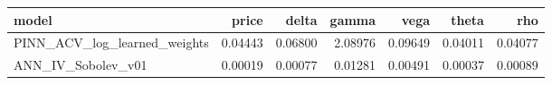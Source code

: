 \begin{tabular}{lrrrrrr}
\toprule
model & price & delta & gamma & vega & theta & rho \\
\midrule
PINN_ACV_log_learned_weights & 0.04443 & 0.06800 & 2.08976 & 0.09649 & 0.04011 & 0.04077 \\
ANN_IV_Sobolev_v01 & 0.00019 & 0.00077 & 0.01281 & 0.00491 & 0.00037 & 0.00089 \\
\bottomrule
\end{tabular}
